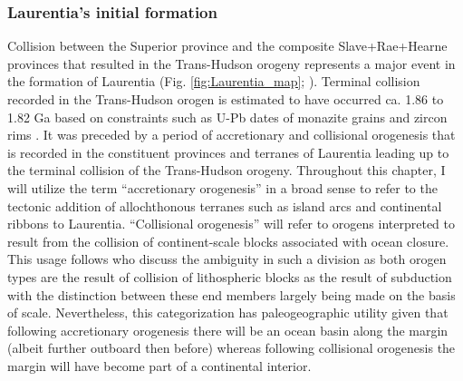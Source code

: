 \documentclass[twocolumn, switch]{article} %
\begin{document}
\subsubsection{Laurentia's initial formation}
Collision between the Superior province and the composite Slave+Rae+Hearne provinces that resulted in the Trans-Hudson orogeny represents a major event in the formation of Laurentia (Fig. \ref{fig:Laurentia_map}; \citealp{Corrigan2009a}). Terminal collision recorded in the Trans-Hudson orogen is estimated to have occurred ca. 1.86 to 1.82 Ga based on constraints such as U-Pb dates of monazite grains and zircon rims \citep{Skipton2016a, Weller2017a}. It was preceded by a period of accretionary and collisional orogenesis that is recorded in the constituent provinces and terranes of Laurentia leading up to the terminal collision of the Trans-Hudson orogeny. Throughout this chapter, I will utilize the term ``accretionary orogenesis'' in a broad sense to refer to the tectonic addition of allochthonous terranes such as island arcs and continental ribbons to Laurentia. ``Collisional orogenesis'' will refer to orogens interpreted to result from the collision of continent-scale blocks associated with ocean closure. This usage follows \cite{Staal2020a} who discuss the ambiguity in such a division as both orogen types are the result of collision of lithospheric blocks as the result of subduction with the distinction between these end members largely being made on the basis of scale. Nevertheless, this categorization has paleogeographic utility given that following accretionary orogenesis there will be an ocean basin along the margin (albeit further outboard then before) whereas following collisional orogenesis the margin will have become part of a continental interior.
\end{document}
